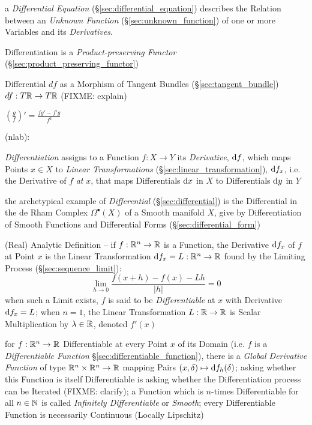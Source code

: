 \fist a \emph{Differential Equation} (\S\ref{sec:differential_equation})
describes the Relation between an \emph{Unknown Function}
(\S\ref{sec:unknown_function}) of one or more Variables and its
\emph{Derivatives}.

Differentiation is a \emph{Product-preserving Functor}
(\S\ref{sec:product_preserving_functor})

Differential $df$ as a Morphism of Tangent Bundles (\S\ref{sec:tangent_bundle})
$df : T\mathbb{R} \rightarrow T\mathbb{R}$ (FIXME: explain)

\asterism

$(\frac{g}{f})' = \frac{f g' - f' g}{f^2}$

\asterism

(nlab):

\emph{Differentiation} assigns to a Function $f : X \rightarrow Y$ its
\emph{Derivative}, $\mathrm{d}f$, which maps Points $x \in X$ to \emph{Linear
  Transformations} (\S\ref{sec:linear_transformation}), $\mathrm{d}f_x$, i.e. the
Derivative of $f$ \emph{at} $x$, that maps Differentials $\mathrm{d}x$ in $X$ to
Differentials $\mathrm{d}y$ in $Y$

\fist the archetypical example of \emph{Differential} (\S\ref{sec:differential})
is the Differential in the de Rham Complex $\Omega^\bullet(X)$ of a Smooth
manifold $X$, give by Differentiation of Smooth Functions and Differential Forms
(\S\ref{sec:differential_form})

(Real) Analytic Definition -- if $f : \mathbb{R}^n \rightarrow \mathbb{R}$ is a
Function, the Derivative $\mathrm{d}f_x$ of $f$ at Point $x$ is the Linear
Transformation $\mathrm{d}f_x = L : \mathbb{R}^n \rightarrow \mathbb{R}$ found by the
Limiting Process (\S\ref{sec:sequence_limit}):
\[
  \lim_{h\rightarrow{0}} \frac{f(x + h) - f(x) - Lh}{|h|} = 0
\]
when such a Limit exists, $f$ is said to be \emph{Differentiable} at $x$ with
Derivative $\mathrm{d}f_x = L$; when $n=1$, the Linear Transformation $L : \mathbb{R}
\rightarrow \mathbb{R}$ is Scalar Multiplication by $\lambda \in \mathbb{R}$, denoted
$f'(x)$

for $f : \mathbb{R}^n \rightarrow \mathbb{R}$ Differentiable at every Point $x$ of its
Domain (i.e. $f$ is a \emph{Differentiable Function}
\S\ref{sec:differentiable_function}), there is a \emph{Global Derivative
  Function} of type $\mathbb{R}^n \times \mathbb{R}^n \rightarrow \mathbb{R}$ mapping Pairs
$(x,\delta) \mapsto \mathrm{d}f_h(\delta)$; asking whether this Function is itself
Differentiable is asking whether the Differentiation process can be Iterated
(FIXME: clarify); a Function which is $n$-times Differentiable for all $n \in
\mathbb{N}$ is called \emph{Infinitely Differentiable} or \emph{Smooth}; every
Differentiable Function is necessarily Continuous (Locally Lipschitz)

